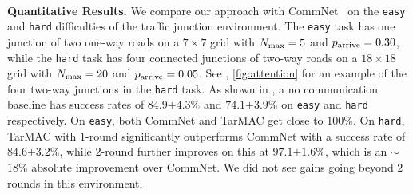 \begin{table}[h]
\centering
     \\[0.05in]
    \caption{Success rates on traffic junction. Our targeted
    $2$-round communication architecture gets a success rate of $97.1${\scriptsize $\pm 1.6\%$}
    on the `hard' variant, significantly outperforming~\citet{sukhbaatar_nips16}.
    Note that $1$- and $2$-round refer to the number of rounds of communication between actions ().}
    \label{table:traffic}
    \vspace{-5pt}
\end{table}

\textbf{Quantitative Results.} We compare our approach with CommNet~\citep{sukhbaatar_nips16} on the \texttt{easy}
and \texttt{hard} difficulties of the traffic junction environment. The \texttt{easy} task has one junction of two one-way roads on a $7 \times 7$ grid with $N_\textnormal{max}=5$ and
$p_\textnormal{arrive}=0.30$, while the \texttt{hard} task has four connected
junctions of two-way roads on a $18 \times 18$ grid with $N_\textnormal{max}=20$ and
$p_\textnormal{arrive}=0.05$.
See , \ref{fig:attention} for an example
of the four two-way junctions in the \texttt{hard} task. As shown in ,
a no communication baseline has success rates of $84.9${\scriptsize $\pm 4.3\%$}
and $74.1${\scriptsize $\pm 3.9\%$} on \texttt{easy} and \texttt{hard}
respectively. On \texttt{easy}, both CommNet and TarMAC get close to $100\%$.
On \texttt{hard}, TarMAC with $1$-round significantly outperforms
CommNet with a success rate of $84.6${\scriptsize $\pm 3.2\%$}, while $2$-round
further improves on this at $97.1${\scriptsize $\pm 1.6\%$},
which is an $\sim$$18\%$ absolute improvement over CommNet.
We did not see gains going beyond $2$ rounds in this environment.

